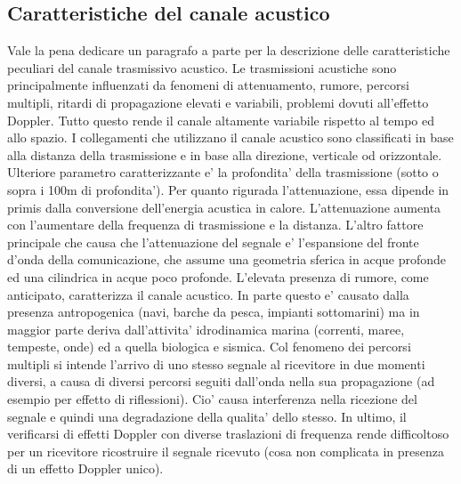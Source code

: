 \subsection{Caratteristiche del canale acustico}
Vale la pena dedicare un paragrafo a parte per la descrizione delle caratteristiche peculiari del canale trasmissivo acustico.\newline
Le trasmissioni acustiche sono principalmente influenzati da fenomeni di attenuamento, rumore, percorsi multipli, ritardi di propagazione elevati e variabili, problemi dovuti all'effetto Doppler.\newline
Tutto questo rende il canale altamente variabile rispetto al tempo ed allo spazio. I collegamenti che utilizzano il canale acustico sono classificati  in base alla distanza della trasmissione e in base alla direzione, verticale od orizzontale. Ulteriore parametro caratterizzante e' la profondita' della trasmissione (sotto o sopra i 100m di profondita').\newline
Per quanto rigurada l'attenuazione, essa dipende in primis dalla conversione dell'energia acustica in calore. L'attenuazione aumenta con l'aumentare della frequenza di trasmissione e la distanza. 
L'altro fattore principale che causa che l'attenuazione del segnale e' l'espansione del fronte d'onda della comunicazione, che assume una geometria sferica in acque profonde ed una cilindrica in acque poco profonde.\newline
L'elevata presenza di rumore, come anticipato, caratterizza il canale acustico. In parte questo e' causato dalla presenza antropogenica (navi, barche da pesca, impianti sottomarini) ma in maggior parte deriva dall'attivita' idrodinamica marina (correnti, maree, tempeste, onde) ed a quella biologica e sismica.\newline
Col fenomeno dei percorsi multipli si intende l'arrivo di uno stesso segnale al ricevitore in due momenti diversi, a causa di diversi percorsi seguiti dall'onda nella sua propagazione (ad esempio per effetto  di riflessioni). Cio' causa interferenza nella ricezione del segnale e quindi una degradazione della qualita' dello stesso.\newline
In ultimo, il verificarsi di effetti Doppler con diverse traslazioni di frequenza rende difficoltoso per un ricevitore ricostruire il segnale ricevuto (cosa non complicata in presenza di un effetto Doppler unico).

